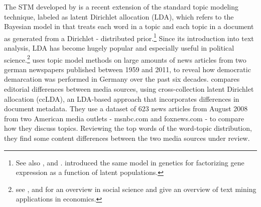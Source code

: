 \documentclass[12pt,a4paper,notitlepage]{article}
\begin{document}
The STM developed by \citet{roberts_model_2016} is a recent extension of the standard topic modeling technique, labeled as latent Dirichlet allocation (LDA), which refers to the Bayesian model in \citet{blei_latent_2003} that treats each word in a topic and each topic in a document as generated from a Dirichlet - distributed prior.\footnote{See also \citet{griffiths_probabilistic_2002}, \citet{griffiths_finding_2004} and \citet{hofmann_probabilistic_1999}. \citet{pritchard_inference_2000} introduced the same model in genetics for factorizing gene expression as a function of latent populations.} Since its introduction into text analysis, LDA has become hugely popular and especially useful in political science.\footnote{see \citet{blei_probabilistic_2012}, \citet{grimmer_text_2013} and \citet{wiedmann_text_2016} for an overview in social science and \citet{gentzkow_text_2017} give an overview of text mining applications in economics.} \citet{wiedmann_text_2016} uses topic model methods on large amounts of news articles from two german newspapers published between 1959 and 2011, to reveal how democratic demarcation was performed in Germany over the past six decades. \citet{paul_cross-collection_2009} compares editorial differences between media sources, using cross-collection latent Dirichlet allocation (ccLDA), an LDA-based approach that incorporates differences in document metadata. They use a dataset of 623 news articles from August 2008 from two American media outlets - msnbc.com and foxnews.com - to compare how they discuss topics. Reviewing the top words of the word-topic distribution, they find some content differences between the two media sources under review. 
\end{document}
